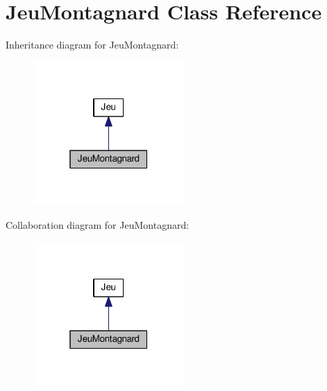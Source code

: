 \hypertarget{classJeuMontagnard}{}\section{Jeu\+Montagnard Class Reference}
\label{classJeuMontagnard}


Inheritance diagram for Jeu\+Montagnard\+:
\nopagebreak
\begin{figure}[H]
\begin{center}
\leavevmode
\includegraphics[width=163pt]{classJeuMontagnard__inherit__graph}
\end{center}
\end{figure}


Collaboration diagram for Jeu\+Montagnard\+:
\nopagebreak
\begin{figure}[H]
\begin{center}
\leavevmode
\includegraphics[width=163pt]{classJeuMontagnard__coll__graph}
\end{center}
\end{figure}
